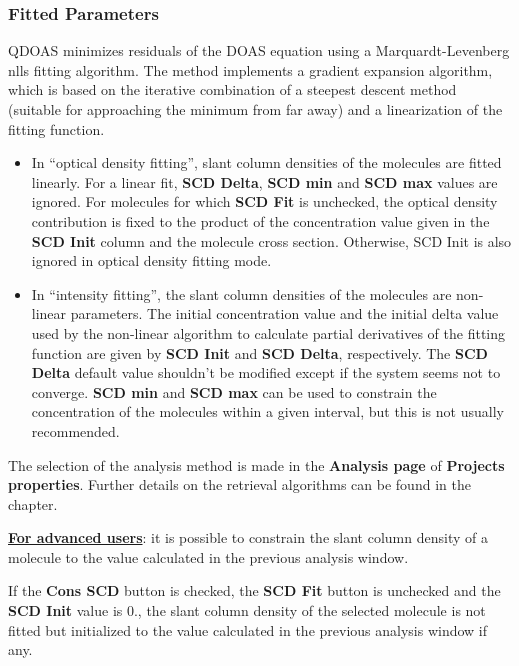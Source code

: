 \subsubsection{Fitted Parameters}
QDOAS minimizes residuals of the DOAS equation using a Marquardt-Levenberg \gls{nlls} fitting algorithm. The method implements a gradient expansion algorithm, which is based on the iterative combination of a steepest descent method (suitable for approaching the minimum from far away) and a linearization of the fitting function.

\begin{itemize}
\item In ``optical density fitting'', slant column densities of the molecules are fitted linearly.  For a linear fit, \textbf{SCD Delta}, \textbf{SCD min} and \textbf{SCD max} values are ignored.  For molecules for which \textbf{SCD Fit} is unchecked, the optical density contribution is fixed to the product of the concentration value given in the \textbf{SCD Init} column and the molecule cross section.  Otherwise, SCD Init is also ignored in optical density fitting mode.
\item In ``intensity fitting'', the slant column densities of the molecules are non-linear parameters. The initial concentration value and the initial delta value used by the non-linear algorithm to calculate partial derivatives of the fitting function are given by \textbf{SCD Init} and \textbf{SCD Delta}, respectively. The \textbf{SCD Delta} default value shouldn't be modified except if the system seems not to converge.  \textbf{SCD min} and \textbf{SCD max} can be used to constrain the concentration of the molecules within a given interval, but this is not usually recommended.
\end{itemize}

The selection of the analysis method is made in the \textbf{Analysis page} of \textbf{Projects properties}. Further details on the retrieval algorithms can be found in the \textbf{} chapter.

\underline{\textbf{For advanced users}}: it is possible to constrain the slant column density of a molecule to the value calculated in the previous analysis window.

\hspace{1cm}\parbox{11.5cm}
{
If the \textbf{Cons SCD} button is checked, the \textbf{SCD Fit} button is unchecked and the \textbf{SCD Init} value is 0., the slant column density of the selected molecule is not fitted but initialized to the value calculated in the previous analysis window if any.
}

